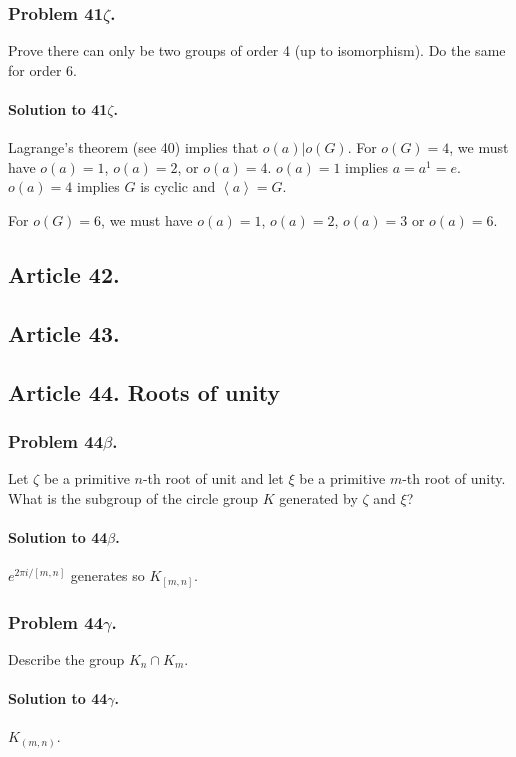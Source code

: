 \subsubsection{Problem 41$\zeta$.}
Prove there can only be two groups of order 4 (up to isomorphism). Do the same
for order 6.

\paragraph*{Solution to 41$\zeta$.}
Lagrange's theorem (see 40) implies that $o(a) | o(G)$. For $o(G)=4$, we must have
$o(a)=1$, $o(a)=2$, or $o(a)=4$. $o(a)=1$ implies $a=a^1=e$. $o(a)=4$ implies
$G$ is cyclic and $\left<a\right> = G$.

For $o(G)=6$, we must have $o(a)=1$, $o(a)=2$, $o(a)=3$ or $o(a)=6$.

\subsection{Article 42.}

\subsection{Article 43.}

\subsection{Article 44. Roots of unity}
\subsubsection{Problem 44$\beta$.}
Let $\zeta$ be a primitive $n$-th root of unit and let $\xi$ be a primitive
$m$-th root of unity. What is the subgroup of the circle group $K$ generated
by $\zeta$ and $\xi$?

\paragraph*{Solution to 44$\beta$.}
$e^{2\pi i / [m,n]}$ generates so $K_{[m,n]}$.

\subsubsection{Problem 44$\gamma$.}
Describe the group $K_n \cap K_m$.

\paragraph*{Solution to 44$\gamma$.}
$K_{(m,n)}$.


